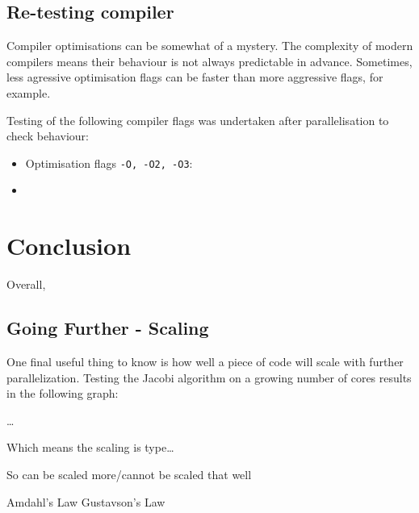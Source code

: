 \documentclass{article}
\begin{document}
\subsection{Re-testing compiler}
Compiler optimisations can be somewhat of a mystery. The complexity of
modern compilers means their behaviour is not always predictable in
advance. Sometimes, less agressive optimisation flags can be faster
than more aggressive flags, for example.

Testing of the following compiler flags was undertaken after
parallelisation to check behaviour:

\begin{itemize}
\item Optimisation flags \texttt{-O, -O2, -O3}: 
\item 
\end{itemize}

\section{Conclusion}
Overall,

\subsection{Going Further - Scaling}
One final useful thing to know is how well a piece of code will scale
with further parallelization. Testing the Jacobi algorithm on a growing number of
cores results in the following graph:

\ldots

Which means the scaling is type\ldots

So can be scaled more/cannot be scaled that well

Amdahl's Law Gustavson's Law
\end{document}
